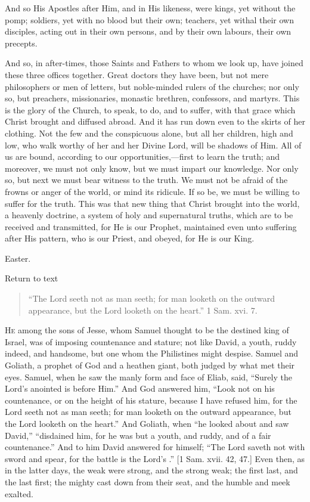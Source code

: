 And so His Apostles after Him, and in His likeness, were kings, yet
without the pomp; soldiers, yet with no blood but their own; teachers,
yet withal their own disciples, acting out in their own persons, and
by their own labours, their own precepts.

And so, in after-times, those Saints and Fathers to whom we look
up, have joined these three offices together. Great doctors they have
been, but not mere philosophers or men of letters, but noble-minded
rulers of the churches; nor only so, but preachers, missionaries,
monastic brethren, confessors, and martyrs. This is the glory of the
Church, to speak, to do, and to suffer, with that grace which Christ
brought and diffused abroad. And it has run down even to the skirts of
her clothing. Not the few and the conspicuous alone, but all her
children, high and low, who walk worthy of her and her Divine Lord,
will be shadows of Him. All of us are bound, according to our
opportunities,—first to learn the truth; and moreover, we must not
only know, but we must impart our knowledge. Nor only so, but next we
must bear witness to the truth. We must not be afraid of the frowns or
anger of the world, or mind its ridicule. If so be, we must be willing
to suffer for the truth. This was that new thing that Christ brought
into the world, a heavenly doctrine, a system of holy and supernatural
truths, which are to be received and transmitted, for He is our
Prophet, maintained even unto suffering after His pattern, who is our
Priest, and obeyed, for He is our King.


Easter.

Return to text


\begin{quote}

``The Lord seeth not as man seeth; for man looketh on the
outward appearance, but the Lord looketh on the heart.'' 1 Sam.
xvi. 7.

\end{quote}

H\textsc{e} among the sons of Jesse, whom Samuel thought to be the destined
king of Israel, was of imposing countenance and stature; not like
David, a youth, ruddy indeed, and handsome, but one whom the
Philistines might despise. Samuel and Goliath, a prophet of God and a
heathen giant, both judged by what met their eyes. Samuel, when he saw
the manly form and face of Eliab, said, ``Surely the Lord's
anointed is before Him.'' And God answered him, ``Look not on
his countenance, or on the height of his stature, because I have
refused him, for the Lord seeth not as man seeth; for man looketh on
the outward appearance, but the Lord looketh on the heart.'' And
Goliath, when ``he looked about and saw David,''
``disdained him, for he was but a youth, and ruddy, and of a fair
countenance.'' And to him David answered for himself; ``The
Lord saveth not with sword and spear, for the battle is the Lord's
.'' [1 Sam. xvii. 42, 47.] Even then, as in the latter days, the
weak were strong, and the strong weak; the first last, and the last
first; the mighty cast down from their seat, and the humble and meek
exalted.

